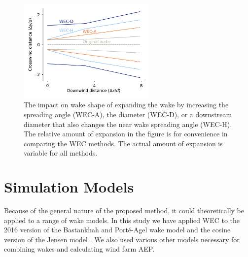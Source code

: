 \documentclass{jpconf}
\begin{document}
\begin{figure}[h]
	\centering
	\includegraphics[width=0.6\textwidth,trim={0, 0, 0, 2.0}]{wec-methods}
	\caption{The impact on wake shape of expanding the wake by increasing the spreading angle (WEC-A), the diameter (WEC-D), or a downstream diameter that also changes the near wake spreading angle (WEC-H). The relative amount of expansion in the figure is for convenience in comparing the WEC methods. The actual amount of expansion is variable for all methods.}
	\label{fig:wec-methods}
\end{figure}

\section{Simulation Models}
Because of the general nature of the proposed method, it could theoretically be applied to a range of wake models. In this study we have applied WEC to the 2016 version of the Bastankhah and Port\'e-Agel wake model \cite{bastankhah2016} and the cosine version of the Jensen model \cite{jensen1983}. We also used various other models necessary for combining wakes and calculating wind farm AEP.
\end{document}

